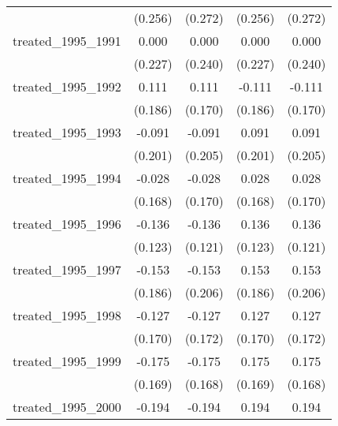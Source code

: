 {\begin{tabular}{l*{4}{c}}
            &     (0.256)         &     (0.272)         &     (0.256)         &     (0.272)         \\
[1em]
treated\_1995\_1991&       0.000         &       0.000         &       0.000         &       0.000         \\
            &     (0.227)         &     (0.240)         &     (0.227)         &     (0.240)         \\
[1em]
treated\_1995\_1992&       0.111         &       0.111         &      -0.111         &      -0.111         \\
            &     (0.186)         &     (0.170)         &     (0.186)         &     (0.170)         \\
[1em]
treated\_1995\_1993&      -0.091         &      -0.091         &       0.091         &       0.091         \\
            &     (0.201)         &     (0.205)         &     (0.201)         &     (0.205)         \\
[1em]
treated\_1995\_1994&      -0.028         &      -0.028         &       0.028         &       0.028         \\
            &     (0.168)         &     (0.170)         &     (0.168)         &     (0.170)         \\
[1em]
treated\_1995\_1996&      -0.136         &      -0.136         &       0.136         &       0.136         \\
            &     (0.123)         &     (0.121)         &     (0.123)         &     (0.121)         \\
[1em]
treated\_1995\_1997&      -0.153         &      -0.153         &       0.153         &       0.153         \\
            &     (0.186)         &     (0.206)         &     (0.186)         &     (0.206)         \\
[1em]
treated\_1995\_1998&      -0.127         &      -0.127         &       0.127         &       0.127         \\
            &     (0.170)         &     (0.172)         &     (0.170)         &     (0.172)         \\
[1em]
treated\_1995\_1999&      -0.175         &      -0.175         &       0.175         &       0.175         \\
            &     (0.169)         &     (0.168)         &     (0.169)         &     (0.168)         \\
[1em]
treated\_1995\_2000&      -0.194         &      -0.194         &       0.194         &       0.194         \\

\end{tabular}}
